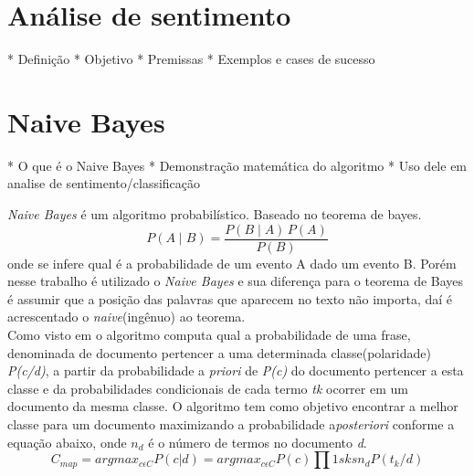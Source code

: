 \section{Análise de sentimento}\label{sec:analise_sentimento}
* Definição
* Objetivo
* Premissas
* Exemplos e cases de sucesso


\section{Naive Bayes}\label{sec:naive_bayes}
* O que é o Naive Bayes
* Demonstração matemática do algoritmo
* Uso dele em analise de sentimento/classificação


\emph{Naive Bayes} é um algoritmo probabilístico. Baseado no teorema de bayes. $$ P(A \mid B) = \frac{P(B \mid A) \, P(A)}{P(B)} $$ onde se infere qual é a probabilidade de um evento A dado um evento B. Porém nesse trabalho é utilizado o \emph{Naive Bayes} e sua diferença para o teorema de Bayes é assumir que a posição das palavras que aparecem no texto não importa, daí é acrescentado o \emph{naive}(ingênuo) ao teorema.
\\ Como visto em \cite{lucca2013implementaccao} o algoritmo computa qual a probabilidade de uma frase, denominada de documento pertencer a uma determinada classe(polaridade) \emph{P(c/d)}, a partir da probabilidade a \emph{priori} de \emph{P(c)} do documento pertencer a esta classe e da probabilidades condicionais de cada termo \emph{tk} ocorrer em um documento da mesma classe. O algoritmo tem como objetivo encontrar a melhor classe para um documento maximizando a probabilidade a\emph{posteriori} conforme a equação abaixo, onde $ n_{d} $ é o número de termos no documento \emph{d}. $$ C_{map}= argmax_{c \epsilon C}P(c|d)=argmax_{c \epsilon C}P(c)\prod 1sksn_{d}P(t_{k}/d) $$